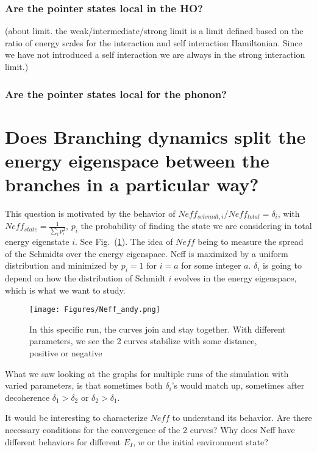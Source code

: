 \documentclass{article}
\begin{document}
\subsubsection{Are the pointer states local in the HO?}

(about limit. the weak/intermediate/strong limit is a limit defined based on the ratio of energy scales for the interaction and self interaction Hamiltonian. Since we have not introduced a self interaction we are always in the strong interaction limit.)



\subsubsection{Are the pointer states local for the phonon?}

\section{Does Branching dynamics split the energy eigenspace between the branches in a particular way?}
This question is motivated by the behavior of $Neff_{schmidt,i}/Neff_{total}=\delta_i$, with $Neff_{state}=\frac{1}{\sum_ip_i^2}$, $p_i$ the probability of finding the state we are considering in total energy eigenstate $i$. See Fig.~(\ref{fig:Neff_andy}). The idea of $Neff$ being to measure the spread of the Schmidts over the energy eigenspace. Neff is maximized by a uniform distribution and minimized by $p_i=1\text{ for }i=a$ for some integer $a$. $\delta_i$ is going to depend on how the distribution of Schmidt $i$ evolves in the energy eigenspace, which is what we want to study.

\begin{figure}[h]
    \centering
    \texttt{[image: Figures/Neff\_andy.png]}
    \caption{In this specific run, the curves join and stay together. With different parameters, we see the 2 curves stabilize with some distance, positive or negative}
    \label{fig:Neff_andy}
\end{figure}

What we saw looking at the graphs for multiple runs of the simulation with varied parameters, is that sometimes both $\delta_i$'s would match up, sometimes after decoherence $\delta_1>\delta_2$ or $\delta_2>\delta_1$.

It would be interesting to characterize $Neff$ to understand its behavior. Are there necessary conditions for the convergence of the 2 curves? Why does Neff have different behaviors for different $E_I$, $w$ or the initial environment state? 
\end{document}
